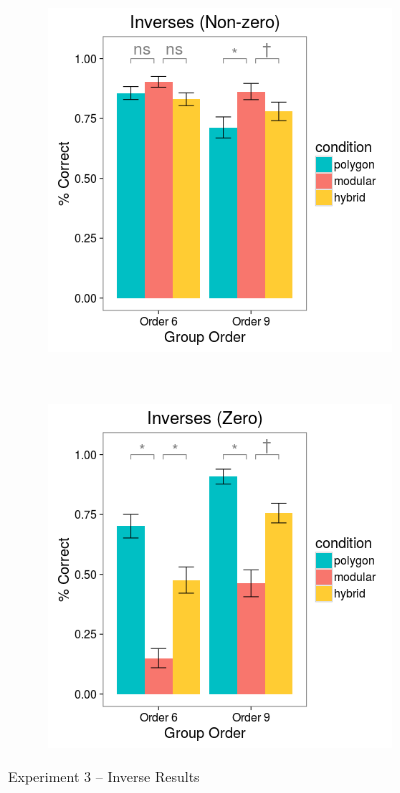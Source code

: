 \documentclass[11pt]{article}
\begin{document}
\begin{figure}[ht]
\centering
\begin{subfigure}[c]{0.4\textwidth}
\centering
\includegraphics[width=\textwidth]{figures/3/in_NZ_r.png}
\end{subfigure}
~
\begin{subfigure}[c]{0.4\textwidth}
\centering
\includegraphics[width=\textwidth]{figures/3/in_Z_r.png}
\end{subfigure}
\caption{Experiment 3 -- Inverse Results}
\label{ex3_in}
\end{figure} 
\end{document}
